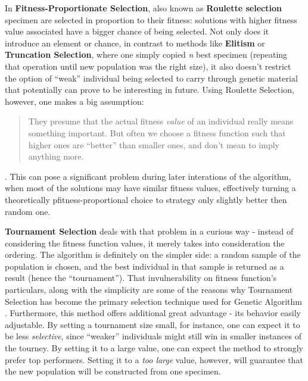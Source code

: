 In \textbf{Fitness-Proportionate Selection}, also known as \textbf{Roulette selection} specimen are selected in proportion to their fitness: solutions with higher fitness value associated have a bigger chance of being selected. Not only does it introduce an element or chance, in contrast to methods like \textbf{Elitism} or \textbf{Truncation Selection}, where one simply copied \textit{n} best specimen (repeating that operation until new population was the right size), it also doesn't restrict the option of ``weak'' individual being selected to carry through genetic material that potentially can prove to be interesting in future. Using Roulette Selection, however, one makes a big assumption:
\begin{quote}
They presume that the actual fitness \textit{value} of an individual really means something important. But often we choose a fitness function such that higher ones are ``better'' than smaller ones, and don’t mean to imply anything more.
\end{quote} \cite{Luke2013Metaheuristics}.
This can pose a significant problem during later interations of the algorithm, when most of the solutions may have similar fitness values, effectively turning a theoretically pfitness-proportional choice to strategy only slightly better then random one.

\textbf{Tournament Selection} deals with that problem in a curious way - instead of considering the fitness function values, it merely takes into consideration the ordering. The algorithm is definitely on the simpler side: a random sample of the population is chosen, and the best individual in that sample is returned as a result (hence the ``tournament''). That invulnerability on fitness function's particulars, along with the simplicity are some of the reasons why Tournament Selection has become the primary selection technique used for Genetic Algorithm \cite{Luke2013Metaheuristics}. Furthermore, this method offers additional great advantage - its behavior easily adjustable. By setting a tournament size small, for instance, one can expect it to be less \textit{selective}, since ``weaker'' individuals might still win in smaller instances of the tourney. By setting it to a large value, one can expect the method to strongly prefer top performers. Setting it to a \textit{too large} value, however, will guarantee that the new population will be constructed from one specimen.

